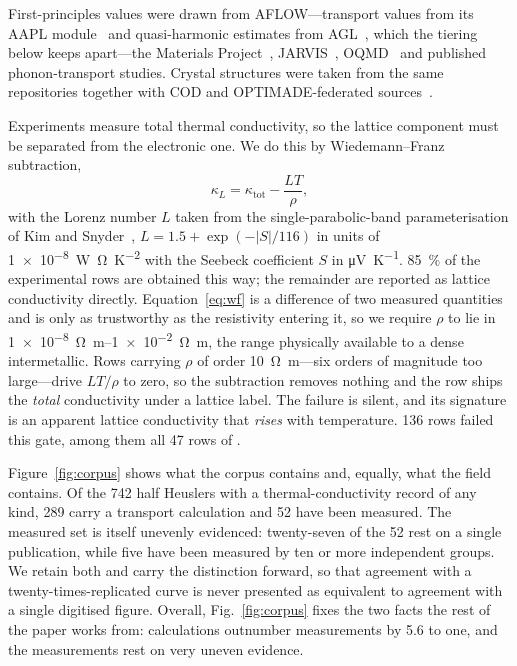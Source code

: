 First-principles values were drawn from
AFLOW---transport values from its AAPL module~\cite{plata2017an} and quasi-harmonic estimates from
AGL~\cite{toher2014highthroug}, which the tiering below keeps apart---the Materials
Project~\cite{jain2013commentary}, JARVIS~\cite{choudhary2020the}, OQMD~\cite{kirklin2015the} and
published phonon-transport studies. Crystal structures were taken from the same repositories
together with COD and OPTIMADE-federated sources~\cite{andersen2021optimade}.

Experiments measure total thermal conductivity, so the lattice component must be separated from the
electronic one. We do this by Wiedemann--Franz subtraction,
%
\begin{equation}
  \kappa_L = \kappa_\mathrm{tot} - \frac{L T}{\rho},
  \label{eq:wf}
\end{equation}
%
with the Lorenz number $L$ taken from the single-parabolic-band parameterisation of Kim and
Snyder~\cite{kim2015characteri}, $L = 1.5 + \exp(-|S|/116)$ in units of
\SI{1e-8}{\watt\ohm\per\kelvin\squared} with the Seebeck coefficient $S$ in
\si{\micro\volt\per\kelvin}. \SI{85}{\percent} of the experimental rows are obtained this way; the
remainder are reported as lattice conductivity directly. Equation~\eqref{eq:wf} is a difference of
two measured quantities and is only as trustworthy as the resistivity entering it, so we require
$\rho$ to lie in \SIrange{1e-8}{1e-2}{\ohm\meter}, the range physically available to a dense
intermetallic. Rows carrying $\rho$ of order \SI{10}{\ohm\meter}---six orders of magnitude too
large---drive $LT/\rho$ to zero, so the subtraction removes nothing and the row ships the
\emph{total} conductivity under a lattice label. The failure is silent, and its signature is an
apparent lattice conductivity that \emph{rises} with temperature. \num{136} rows failed this gate,
among them all \num{47} rows of .

Figure~\ref{fig:corpus} shows what the corpus contains and, equally, what the field contains. Of
the \num{742} half Heuslers with a thermal-conductivity record of any kind, \num{289} carry a
transport calculation and \num{52} have been measured. The measured set is itself unevenly
evidenced: twenty-seven of the \num{52} rest on a single publication, while five have been measured
by ten or more independent groups. We retain both and carry the distinction forward, so that
agreement with a twenty-times-replicated curve is never presented as equivalent to agreement with a
single digitised figure. Overall, Fig.~\ref{fig:corpus} fixes the two facts the rest of the paper
works from: calculations outnumber measurements by \num{5.6} to one, and the measurements rest on
very uneven evidence.

